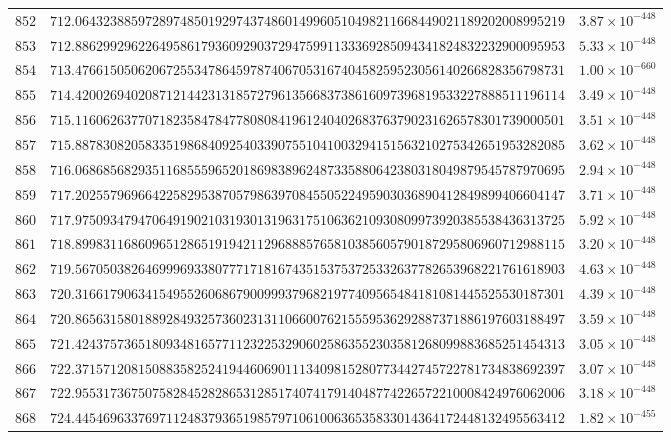 \documentclass[12pt,reqno]{amsart}
\theoremstyle{remark}
\begin{document}
\begin{longtable}{clc}
$852$ & $712.0643238859728974850192974374860149960510498211668449021189202008995219$ & $3.87\times 10^{-448}$ \\
$853$ & $712.8862992962264958617936092903729475991133369285094341824832232900095953$ & $5.33\times 10^{-448}$ \\
$854$ & $713.4766150506206725534786459787406705316740458259523056140266828356798731$ & $1.00\times 10^{-660}$ \\
$855$ & $714.4200269402087121442313185727961356683738616097396819533227888511196114$ & $3.49\times 10^{-448}$ \\
$856$ & $715.1160626377071823584784778080841961240402683763790231626578301739000501$ & $3.51\times 10^{-448}$ \\
$857$ & $715.8878308205833519868409254033907551041003294151563210275342651953282085$ & $3.62\times 10^{-448}$ \\
$858$ & $716.0686856829351168555965201869838962487335880642380318049879545787970695$ & $2.94\times 10^{-448}$ \\
$859$ & $717.2025579696642258295387057986397084550522495903036890412849899406604147$ & $3.71\times 10^{-448}$ \\
$860$ & $717.9750934794706491902103193013196317510636210930809973920385538436313725$ & $5.92\times 10^{-448}$ \\
$861$ & $718.8998311686096512865191942112968885765810385605790187295806960712988115$ & $3.20\times 10^{-448}$ \\
$862$ & $719.5670503826469996933807771718167435153753725332637782653968221761618903$ & $4.63\times 10^{-448}$ \\
$863$ & $720.3166179063415495526068679009993796821977409565484181081445525530187301$ & $4.39\times 10^{-448}$ \\
$864$ & $720.8656315801889284932573602313110660076215559536292887371886197603188497$ & $3.59\times 10^{-448}$ \\
$865$ & $721.4243757365180934816577112322532906025863552303581268099883685251454313$ & $3.05\times 10^{-448}$ \\
$866$ & $722.3715712081508835825241944606901113409815280773442745722781734838692397$ & $3.07\times 10^{-448}$ \\
$867$ & $722.9553173675075828452828653128517407417914048774226572210008424976062006$ & $3.18\times 10^{-448}$ \\
$868$ & $724.4454696337697112483793651985797106100636535833014364172448132495563412$ & $1.82\times 10^{-455}$ \\

\end{longtable}
\end{document}
